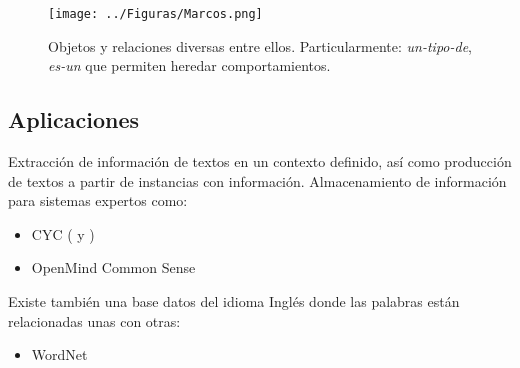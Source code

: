 \begin{figure}
 \centering
 \texttt{[image: ../Figuras/Marcos.png]}
  \caption{Objetos y relaciones diversas entre ellos.  Particularmente: \emph{un-tipo-de}, \emph{es-un} que permiten heredar comportamientos.}
\end{figure}


\subsection{Aplicaciones}
Extracción de información de textos en un contexto definido, así como producción de textos a partir de instancias con información.
Almacenamiento de información para sistemas expertos como:
\begin{itemize}
 \item CYC ( y )
 \item OpenMind Common Sense 
\end{itemize}

Existe también una base datos del idioma Inglés donde las palabras están relacionadas unas con otras:
\begin{itemize}
 \item WordNet 
\end{itemize}
 
%
